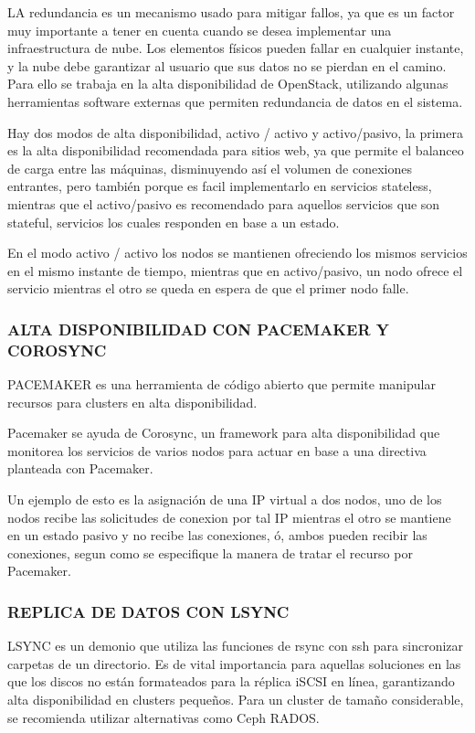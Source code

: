     LA redundancia es un mecanismo usado para mitigar fallos, ya que es un factor muy importante a tener en cuenta cuando se desea implementar una infraestructura de nube. Los elementos físicos pueden fallar en cualquier instante, y la nube debe garantizar al usuario que sus datos no se pierdan en el camino. Para ello se trabaja en la alta disponibilidad de OpenStack, utilizando algunas herramientas software externas que permiten redundancia de datos en el sistema.
    
    Hay dos modos de alta disponibilidad, activo / activo y activo/pasivo, la primera es la alta disponibilidad recomendada para sitios web, ya que permite el balanceo de carga entre las máquinas, disminuyendo así el volumen de conexiones entrantes, pero también porque es facil implementarlo en servicios stateless, mientras que el activo/pasivo es recomendado para aquellos servicios que son stateful, servicios los cuales responden en base a un estado.
 
 	En el modo activo / activo los nodos se mantienen ofreciendo los mismos servicios en el mismo instante de tiempo, mientras que en activo/pasivo, un nodo ofrece el servicio mientras el otro se queda en espera de que el primer nodo falle.
    
    \subsubsection{ALTA DISPONIBILIDAD CON PACEMAKER Y COROSYNC}
	    
    PACEMAKER es una herramienta de código abierto que permite manipular recursos para clusters en alta disponibilidad.
    
    Pacemaker se ayuda de Corosync, un framework para alta disponibilidad que monitorea los servicios de varios nodos para actuar en base a una directiva planteada con Pacemaker.
    
    Un ejemplo de esto es la asignación de una IP virtual a dos nodos, uno de los nodos recibe las solicitudes de conexion por tal  IP mientras el otro se mantiene en un estado pasivo y no recibe las conexiones, ó, ambos pueden recibir las conexiones, segun como se especifique la manera de tratar el recurso por Pacemaker.
    
    \subsubsection{REPLICA DE DATOS CON LSYNC}
    
    LSYNC es un demonio que utiliza las funciones de rsync con ssh para sincronizar carpetas de un directorio. Es de vital importancia para aquellas soluciones en las que los discos no están formateados para la réplica iSCSI en línea, garantizando alta disponibilidad en clusters pequeños. Para un cluster de tamaño considerable, se recomienda utilizar alternativas como Ceph RADOS.
    
